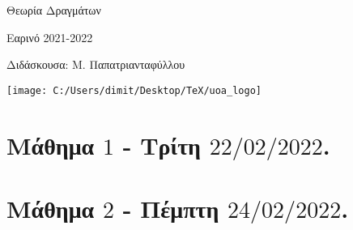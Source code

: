 \documentclass[oneside,a4paper]{article}
\begin{document}
	
	
	\begin{framed}	
		\begin{center}
			\huge Θεωρία Δραγμάτων
		\end{center}
		\begin{center}
			 Εαρινό 2021-2022
		\end{center}
		\vspace{0.3truecm}
		\begin{center}
			Διδάσκουσα: Μ. Παπατριανταφύλλου
		\end{center}
		\vspace{0.3truecm}
	\end{framed}
	\vspace*{\fill}
	\begin{center}
	\texttt{[image: C:/Users/dimit/Desktop/TeX/uoa\_logo]}
	\end{center}
\vspace{1cm}
\pagebreak

\section*{Μάθημα $1$ - Τρίτη $22/02/2022$.}
\vspace{0.3truecm}


\pagebreak


\section*{Μάθημα $2$ - Πέμπτη $24/02/2022$.}
\vspace{0.3truecm}


\pagebreak
\end{document}
